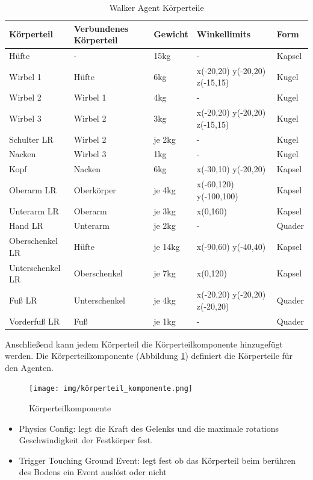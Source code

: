 \begin{table}[H]
  \centering
  {
  \begin{tabular}{ |p{3cm}|p{3cm}|p{2cm}|p{4cm}|p{2cm}| }
  \hline
  \textbf{Körpertei}l& \textbf{Verbundenes Körperteil} & \textbf{Gewicht} & \textbf{Winkellimits} & \textbf{Form} \\
  \hline
  Hüfte & - & 15kg & - & Kapsel \\
  \hline
  Wirbel 1 & Hüfte & 6kg & x(-20,20) y(-20,20) z(-15,15) & Kugel \\
  \hline
  Wirbel 2 & Wirbel 1 & 4kg & - & Kugel \\
  \hline
  Wirbel 3 & Wirbel 2 & 3kg & x(-20,20) y(-20,20) z(-15,15) & Kugel \\
  \hline
  Schulter LR & Wirbel 2 & je 2kg& - & Kugel \\
  \hline
  Nacken & Wirbel 3 & 1kg & - & Kugel \\
  \hline
  Kopf & Nacken & 6kg & x(-30,10) y(-20,20) & Kapsel \\
  \hline
  Oberarm LR & Oberkörper & je 4kg & x(-60,120) y(-100,100) & Kapsel \\
  \hline
  Unterarm LR & Oberarm & je 3kg & x(0,160) & Kapsel \\
  \hline
  Hand LR & Unterarm & je 2kg & - & Quader \\
  \hline
  Oberschenkel LR & Hüfte & je 14kg& x(-90,60) y(-40,40) & Kapsel \\
  \hline
  Unterschenkel LR & Oberschenkel & je 7kg &  x(0,120) & Kapsel \\
  \hline
  Fuß LR & Unterschenkel & je 4kg & x(-20,20) y(-20,20) z(-20,20) & Quader \\
  \hline
  Vorderfuß LR & Fuß & je 1kg & - & Quader \\
  \hline
  \end{tabular}}
  \caption{Walker Agent Körperteile}
  \label{table:walker_körperteile}
\end{table}

Anschließend kann jedem Körperteil die Körperteilkomponente hinzugefügt werden. Die Körperteilkomponente (Abbildung \ref{fig:körperteil_komponente}) definiert die Körperteile für den Agenten.
\begin{figure}[H]
  \centering  
  \texttt{[image: img/körperteil\_komponente.png]}
  \caption{Körperteilkomponente}
  \label{fig:körperteil_komponente}
\end{figure}

\begin{itemize}
  \item Physics Config: legt die Kraft des Gelenks und die maximale rotations Geschwindigkeit der Festkörper fest.
  \item Trigger Touching Ground Event: legt fest ob das Körperteil beim berühren des Bodens ein Event auslöst oder nicht
\end{itemize}

